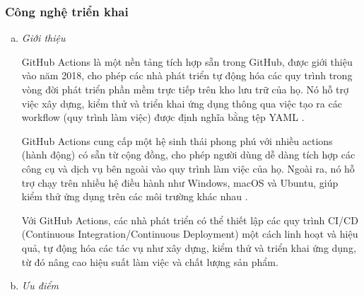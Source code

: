\subsubsection{Công nghệ triển khai}
    \begin{enumerate}[(a)]
        \item \textit{Giới thiệu}

        GitHub Actions là một nền tảng tích hợp sẵn trong GitHub, được giới thiệu vào năm 2018, cho phép các nhà phát triển tự động hóa các quy trình trong vòng đời phát triển phần mềm trực tiếp trên kho lưu trữ của họ. Nó hỗ trợ việc xây dựng, kiểm thử và triển khai ứng dụng thông qua việc tạo ra các workflow (quy trình làm việc) được định nghĩa bằng tệp YAML \cite{Viblo}.

        GitHub Actions cung cấp một hệ sinh thái phong phú với nhiều actions (hành động) có sẵn từ cộng đồng, cho phép người dùng dễ dàng tích hợp các công cụ và dịch vụ bên ngoài vào quy trình làm việc của họ. Ngoài ra, nó hỗ trợ chạy trên nhiều hệ điều hành như Windows, macOS và Ubuntu, giúp kiểm thử ứng dụng trên các môi trường khác nhau \cite{Viblo}.

        Với GitHub Actions, các nhà phát triển có thể thiết lập các quy trình CI/CD (Continuous Integration/Continuous Deployment) một cách linh hoạt và hiệu quả, tự động hóa các tác vụ như xây dựng, kiểm thử và triển khai ứng dụng, từ đó nâng cao hiệu suất làm việc và chất lượng sản phẩm.

        \item \textit{Ưu điểm}


\end{enumerate}
